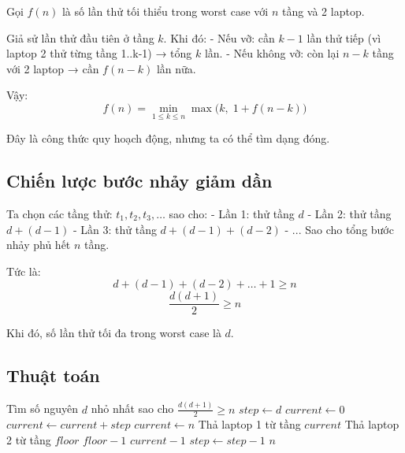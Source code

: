 \documentclass{article}
\begin{document}
Gọi \(f(n)\) là số lần thử tối thiểu trong worst case với \(n\) tầng và 2 laptop.

Giả sử lần thử đầu tiên ở tầng \(k\). Khi đó:
- Nếu vỡ: cần \(k-1\) lần thử tiếp (vì laptop 2 thử từng tầng 1..k-1) → tổng \(k\) lần.
- Nếu không vỡ: còn lại \(n-k\) tầng với 2 laptop → cần \(f(n-k)\) lần nữa.

Vậy:
\[
f(n) = \min_{1 \le k \le n} \max\big(k,\; 1 + f(n-k)\big)
\]

Đây là công thức quy hoạch động, nhưng ta có thể tìm dạng đóng.

\subsection{Chiến lược bước nhảy giảm dần}

Ta chọn các tầng thử: \(t_1, t_2, t_3, \dots\) sao cho:
- Lần 1: thử tầng \(d\)
- Lần 2: thử tầng \(d + (d-1)\)
- Lần 3: thử tầng \(d + (d-1) + (d-2)\)
- ...
Sao cho tổng bước nhảy phủ hết \(n\) tầng.

Tức là:
\[
d + (d-1) + (d-2) + \dots + 1 \ge n
\]
\[
\frac{d(d+1)}{2} \ge n
\]

Khi đó, số lần thử tối đa trong worst case là \(d\).

\subsection{Thuật toán}

\begin{algorithmic}[1]
    \State Tìm số nguyên \(d\) nhỏ nhất sao cho \(\frac{d(d+1)}{2} \ge n\)
    \State \(step \gets d\)
    \State \(current \gets 0\)
    \State {}
        \State \(current \gets current + step\)
            \State \(current \gets n\)
        \EndIf
        \State Thả laptop 1 từ tầng \(current\)
            \State {}
                \State Thả laptop 2 từ tầng \(floor\)
                    \State \Return \(floor - 1\) 
                \EndIf
            \EndFor
            \State \Return \(current - 1\) 
        \EndIf
        \State \(step \gets step - 1\)
    \EndWhile
    \State \Return \(n\) 
\EndFunction
\end{algorithmic}
\end{document}
